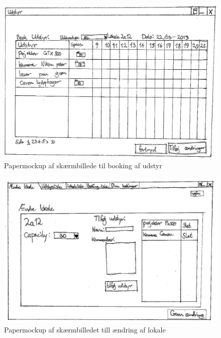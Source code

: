\begin{figure}[h!]
  \centering
    \includegraphics[angle=90, height=0.9\textheight]{Appendix/GUI-Prototype/PaperMockup/BookUdstyr_001}
  \caption{Papermockup af  skærmbillede til booking af udstyr}
\label{App_GUI_paper_BookUdstyr}
\end{figure}

\begin{figure}[h!]
  \centering
    \includegraphics[angle=90, height=0.9\textheight]{Appendix/GUI-Prototype/PaperMockup/AendreLokale_001}
  \caption{Papermockup  af skærmbilledet till ændring af lokale}
\label{App_GUI_paper_AendreLokale}
\end{figure}

